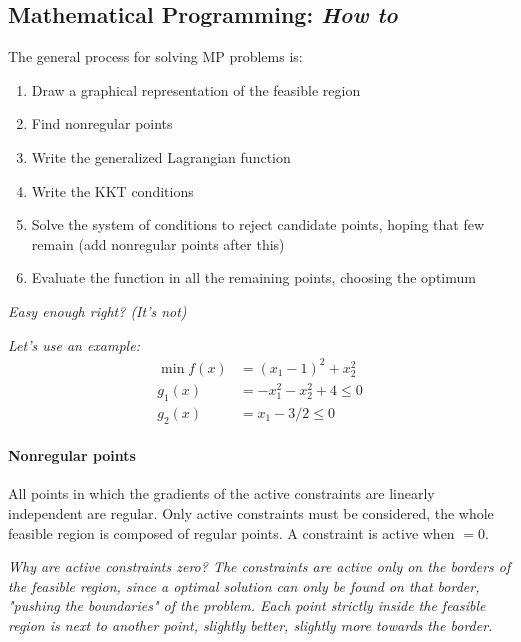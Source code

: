 
\subsection{Mathematical Programming: \textit{How to}}

The general process for solving MP problems is: 
\begin{enumerate}
	\item Draw a graphical representation of the feasible region
	
	\item Find nonregular points
	
	\item Write the generalized Lagrangian function
	
	\item Write the KKT conditions
	
	\item Solve the system of conditions to reject candidate points, hoping that few remain (add nonregular points after this)
	
	\item Evaluate the function in all the remaining points, choosing the optimum
\end{enumerate}

\textit{Easy enough right? (It's not)}

\textit{Let's use an example:
\begin{align*}
	\min f(x) & = (x_1 - 1)^2 + x_2^2 \\
	g_1 (x) & = -x_1^2 -x_2^2 + 4 \leq 0 \\
	g_2 (x) & = x_1 - 3/2 \leq 0
\end{align*}}

\paragraph{Nonregular points} All points in which the gradients of the active constraints are linearly independent are regular. Only active constraints must be considered, the whole feasible region is composed of regular points. A constraint is active when $= 0$. 

\textit{Why are active constraints zero? The constraints are active only on the borders of the feasible region, since a optimal solution can only be found on that border, "pushing the boundaries" of the problem. Each point strictly inside the feasible region is next to another point, slightly better, slightly more towards the border.}

